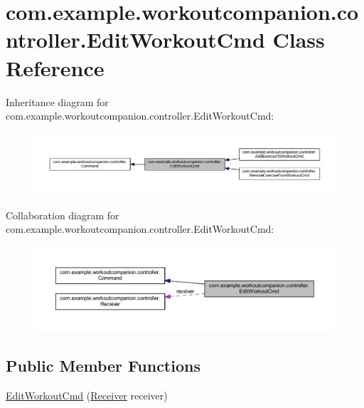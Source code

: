 \hypertarget{classcom_1_1example_1_1workoutcompanion_1_1controller_1_1_edit_workout_cmd}{\section{com.\-example.\-workoutcompanion.\-controller.\-Edit\-Workout\-Cmd Class Reference}
\label{classcom_1_1example_1_1workoutcompanion_1_1controller_1_1_edit_workout_cmd}
}


Inheritance diagram for com.\-example.\-workoutcompanion.\-controller.\-Edit\-Workout\-Cmd\-:\nopagebreak
\begin{figure}[H]
\begin{center}
\leavevmode
\includegraphics[width=350pt]{classcom_1_1example_1_1workoutcompanion_1_1controller_1_1_edit_workout_cmd__inherit__graph}
\end{center}
\end{figure}


Collaboration diagram for com.\-example.\-workoutcompanion.\-controller.\-Edit\-Workout\-Cmd\-:\nopagebreak
\begin{figure}[H]
\begin{center}
\leavevmode
\includegraphics[width=350pt]{classcom_1_1example_1_1workoutcompanion_1_1controller_1_1_edit_workout_cmd__coll__graph}
\end{center}
\end{figure}
\subsection*{Public Member Functions}
\begin{DoxyCompactItemize}
\item 
\hyperlink{classcom_1_1example_1_1workoutcompanion_1_1controller_1_1_edit_workout_cmd_a8d6241f5081888e0bec1a15c8051e6ec}{Edit\-Workout\-Cmd} (\hyperlink{classcom_1_1example_1_1workoutcompanion_1_1controller_1_1_receiver}{Receiver} receiver)
\end{DoxyCompactItemize}


